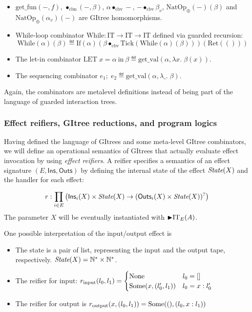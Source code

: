 \documentclass{article}
\theoremstyle{definition}
\theoremstyle{plain}
\theoremstyle{remark}
\newcommand{\Ins}{\mathsf{Ins}}
\newcommand{\Outs}{\mathsf{Outs}}
\newcommand{\efinput}{\mathrm{input}}
\newcommand{\efoutput}{\mathrm{output}}
\newcommand{\IT}{\mathrm{IT}}
\newcommand{\gRet}{\mathrm{Ret}}
\newcommand{\gVis}{\mathrm{Vis}}
\newcommand{\Tick}{\mathrm{Tick}}
\newcommand{\getfun}{\mathrm{get\_fun}}
\newcommand{\getval}{\mathrm{get\_val}}
\newcommand{\cbnap}{\bullet_{\text{cbn}}}
\newcommand{\cbvap}{\bullet_{\text{cbv}}}
\newcommand{\gnatop}[1]{\mathrm{NatOp}_{#1}}
\newcommand{\gif}{\mathrm{If}}
\newcommand{\gwhile}{\mathrm{While}}
\begin{document}
\begin{itemize}
\begin{align*}
      \gnatop{\oplus}(\gVis_i(x,k))(\beta)   &\equiv
         \gVis_i(x,\latert\circ\gnatop{\oplus}(-)(\beta)\circ k)
    \end{align*}
  \item \(\getfun(-,f)\), \(\cbnap(-,\beta)\), \(\alpha \cbvap -\), \(-\cbvap \beta_v\), \(\gnatop{\oplus}(-)(\beta)\) and \(\gnatop{\oplus}(\alpha_v)(-)\) are GItree homomorphisms.
  \item While-loop combinator \(\gwhile : \IT \to \IT \to \IT\) defined via guarded recursion:
    \[
      \gwhile(\alpha)(\beta) \eqdef
      \gif(\alpha)(\beta \cbvap \Tick(\gwhile(\alpha)(\beta)))(\gRet(()))
    \]
  \item The let-in combinator \(\mathrm{LET}\;x=\alpha\ \mathrm{in}\ \beta \eqdef \getval(\alpha, \lambda x.\;\beta(x))\).
  \item The sequencing combinator \(e_1;\;e_2 \eqdef \getval(\alpha, \lambda \_.\;\beta)\).
\end{itemize}

Again, the combinators are metalevel definitions instead of being part of the language of guarded interaction trees.

\subsubsection{Effect reifiers, GItree reductions, and program logics}

Having defined the language of GItrees and some meta-level GItree combinators, we will define an operational semantics of GItrees that actually evaluate effect invocation by using \emph{effect reifiers}. A reifier specifies a semantics of an effect signature \((E,\Ins,\Outs)\) by defining the internal state of the effect \(\textit{State}(X)\) and the handler for each effect:

\[
  r : \prod_{i\in E} \left( \Ins_i(X) \times \State(X) \to \option{(\Outs_i(X) \times \State(X))} \right)
\]
The parameter \(X\) will be eventually instantiated with \(\latert \IT_E(A)\).

One possible interpretation of the input/output effect is

\begin{itemize}
  \item The state is a pair of list, representing the input and the output tape, respectively. \(\textit{State}(X) = \mathbb{N}^\ast \times \mathbb{N}^\ast\).
  \item The reifier for \(\efinput\):
    \(
      r_{\efinput}(l_0,l_1) = \begin{cases}
        \None & l_0 = [] \\
        \Some(x, (l_0',l_1)) & l_0 = x \col l_0'
      \end{cases}
    \)
  \item The reifier for \(\efoutput\) is
    \(
      r_{\efoutput}(x,(l_0,l_1)) = \Some((), (l_0, x \col l_1))
    \)
\end{itemize}
\end{document}

